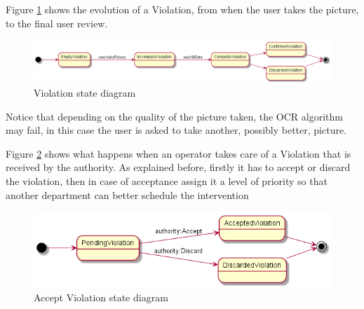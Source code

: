 Figure \ref{fig:violationDiagram} shows the evolution of a Violation, from when the user takes the picture, to the final user review.

\begin{figure}[H]
    \centering
    \includegraphics[width=\linewidth]{../diagrams/state_diagram_violation.png}
    \caption{Violation state diagram}
    \label{fig:violationDiagram}
\end{figure}

Notice that depending on the quality of the picture taken, the OCR algorithm may fail, in this case the user is asked to take another, possibly better, picture. 

Figure \ref{fig:acceptViolationDiagram} shows what happens when an operator takes care of a Violation that is received by the authority. As explained before, firstly it has to accept or discard the violation, then in case of acceptance assign it a level of priority so that another department can better schedule the intervention

\begin{figure}[H]
    \centering
    \includegraphics[width=\linewidth]{../diagrams/state_diagram_accept_violation.png}
    \caption{Accept Violation state diagram}
    \label{fig:acceptViolationDiagram}
\end{figure}